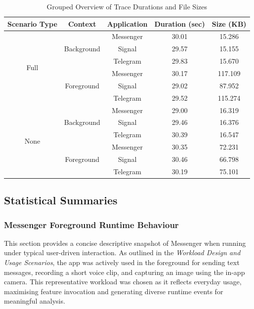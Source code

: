 \documentclass[a4paper,12pt]{report}
\begin{document}
\begin{table}[h!]
    \centering
    \caption{Grouped Overview of Trace Durations and File Sizes}
    \label{tab:dynamic_traces_grouped}
    \begin{tabular}{|c|c|c|c|c|}
        \hline
        \textbf{Scenario Type} & \textbf{Context} & \textbf{Application} & \textbf{Duration (sec)} & \textbf{Size (KB)} \\
        \hline
        \multirow{6}{*}{Full}
        & \multirow{3}{*}{Background} & Messenger & 30.01 & 15.286 \\
        & & Signal & 29.57 & 15.155 \\
        & & Telegram & 29.83 & 15.670 \\
        & \multirow{3}{*}{Foreground} & Messenger & 30.17 & 117.109 \\
        & & Signal & 29.02 & 87.952 \\
        & & Telegram & 29.52 & 115.274 \\
        \hline
        \multirow{6}{*}{None}
        & \multirow{3}{*}{Background} & Messenger & 29.00 & 16.319 \\
        & & Signal & 29.46 & 16.376 \\
        & & Telegram & 30.39 & 16.547 \\
        & \multirow{3}{*}{Foreground} & Messenger & 30.35 & 72.231 \\
        & & Signal & 30.46 & 66.798 \\
        & & Telegram & 30.19 & 75.101 \\
        \hline
    \end{tabular}
\end{table}


\subsection{Statistical Summaries}

\subsubsection{Messenger Foreground Runtime Behaviour}

This section provides a concise descriptive snapshot of Messenger when running under typical user-driven interaction. As outlined in the \textit{Workload Design and Usage Scenarios}, the app was actively used in the foreground for sending text messages, recording a short voice clip, and capturing an image using the in-app camera. This representative workload was chosen as it reflects everyday usage, maximising feature invocation and generating diverse runtime events for meaningful analysis.
\end{document}
